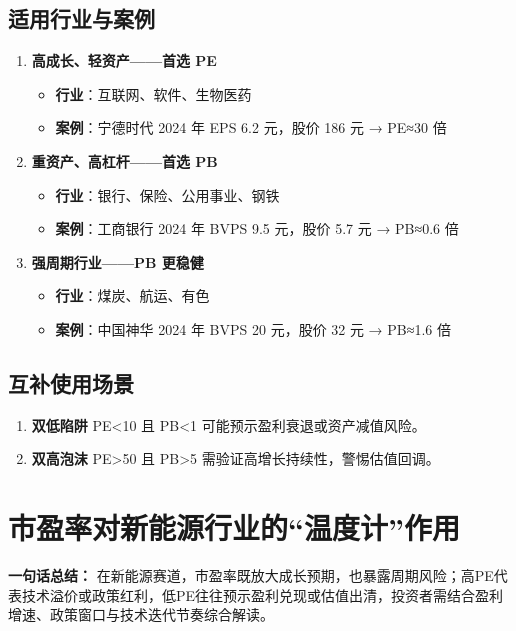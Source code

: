 \subsection{适用行业与案例}
\begin{enumerate}[leftmargin=*, nosep]
    \item \textbf{高成长、轻资产——首选 PE}  
    \begin{itemize}[nosep]  
        \item \textbf{行业}：互联网、软件、生物医药  
        \item \textbf{案例}：宁德时代 2024 年 EPS 6.2 元，股价 186 元 → PE≈30 倍  
    \end{itemize}

    \item \textbf{重资产、高杠杆——首选 PB}  
    \begin{itemize}[nosep]  
        \item \textbf{行业}：银行、保险、公用事业、钢铁  
        \item \textbf{案例}：工商银行 2024 年 BVPS 9.5 元，股价 5.7 元 → PB≈0.6 倍  
    \end{itemize}

    \item \textbf{强周期行业——PB 更稳健}  
    \begin{itemize}[nosep]  
        \item \textbf{行业}：煤炭、航运、有色  
        \item \textbf{案例}：中国神华 2024 年 BVPS 20 元，股价 32 元 → PB≈1.6 倍  
    \end{itemize}
\end{enumerate}

\subsection{互补使用场景}
\begin{enumerate}[leftmargin=*, nosep]
    \item \textbf{双低陷阱}  
    PE<10 且 PB<1 可能预示盈利衰退或资产减值风险。  
    \item \textbf{双高泡沫}  
    PE>50 且 PB>5 需验证高增长持续性，警惕估值回调。
\end{enumerate}

\section{市盈率对新能源行业的“温度计”作用}
\textbf{一句话总结：}  
在新能源赛道，市盈率既放大成长预期，也暴露周期风险；高PE代表技术溢价或政策红利，低PE往往预示盈利兑现或估值出清，投资者需结合盈利增速、政策窗口与技术迭代节奏综合解读。

